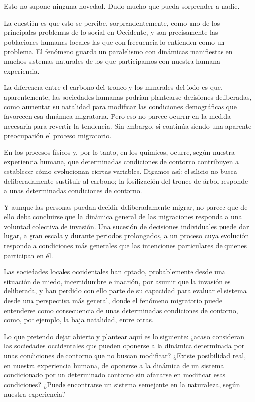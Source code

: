 \documentclass[12pt,a4paper]{article}
\begin{document}
Esto no supone ninguna novedad. Dudo mucho que pueda sorprender a nadie.

La cuestión es que esto se percibe, sorprendentemente, como uno de los principales problemas de lo social en Occidente, y son precisamente las poblaciones humanas locales las que con frecuencia lo entienden como un problema. El fenómeno guarda un paralelismo con dinámicas manifiestas en muchos sistemas naturales de los que participamos con nuestra humana experiencia.

La diferencia entre el carbono del tronco y los minerales del lodo es que, aparentemente, las sociedades humanas podrían plantearse decisiones deliberadas, como aumentar su natalidad para modificar las condiciones demográficas que favorecen esa dinámica migratoria. Pero eso no parece ocurrir en la medida necesaria para revertir la tendencia. Sin embargo, sí continúa siendo una aparente preocupación el proceso migratorio.

En los procesos físicos y, por lo tanto, en los químicos, ocurre, según nuestra experiencia humana, que determinadas condiciones de contorno contribuyen a establecer cómo evolucionan ciertas variables. Digamos así: el silicio no busca deliberadamente sustituir al carbono; la fosilización del tronco de árbol responde a unas determinadas condiciones de contorno.

Y aunque las personas puedan decidir deliberadamente migrar, no parece que de ello deba concluirse que la dinámica general de las migraciones responda a una voluntad colectiva de invasión. Una sucesión de decisiones individuales puede dar lugar, a gran escala y durante periodos prolongados, a un proceso cuya evolución responda a condiciones más generales que las intenciones particulares de quienes participan en él.

Las sociedades locales occidentales han optado, probablemente desde una situación de miedo, incertidumbre e inacción, por asumir que la invasión es deliberada, y han perdido con ello parte de su capacidad para evaluar el sistema desde una perspectiva más general, donde el fenómeno migratorio puede entenderse como consecuencia de unas determinadas condiciones de contorno, como, por ejemplo, la baja natalidad, entre otras.

Lo que pretendo dejar abierto y plantear aquí es lo siguiente: ¿acaso consideran las sociedades occidentales que pueden oponerse a la dinámica determinada por unas condiciones de contorno que no buscan modificar? ¿Existe posibilidad real, en nuestra experiencia humana, de oponerse a la dinámica de un sistema condicionado por un determinado contorno sin afanarse en modificar esas condiciones? ¿Puede encontrarse un sistema semejante en la naturaleza, según nuestra experiencia?
\end{document}
